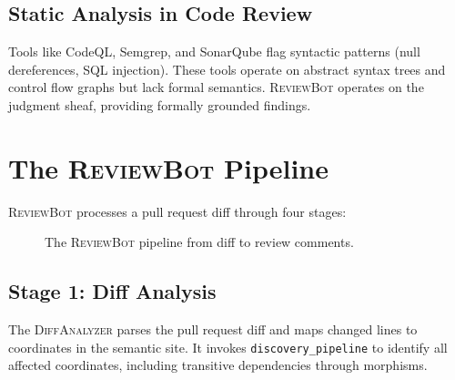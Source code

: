 \documentclass[11pt]{article}
\newcommand{\ReviewBot}{\textsc{ReviewBot}}
\newcommand{\DiffAnalyzer}{\textsc{DiffAnalyzer}}
\newcommand{\CommentGen}{\textsc{CommentGenerator}}
\begin{document}
\subsection{Static Analysis in Code Review}

Tools like CodeQL, Semgrep, and SonarQube flag syntactic patterns
(null dereferences, SQL injection). These tools operate on abstract syntax
trees and control flow graphs but lack formal semantics. \ReviewBot{}
operates on the judgment sheaf, providing formally grounded findings.

\section{The \ReviewBot{} Pipeline}\label{sec:pipeline}

\ReviewBot{} processes a pull request diff through four stages:

\begin{figure}[t]
\centering
{}
\caption{The \ReviewBot{} pipeline from diff to review comments.}
\label{fig:reviewbot}
\end{figure}

\subsection{Stage 1: Diff Analysis}

The \DiffAnalyzer{} parses the pull request diff and maps changed lines to
coordinates in the semantic site. It invokes \texttt{discovery\_pipeline} to
identify all affected coordinates, including transitive dependencies through
morphisms.
\end{document}

